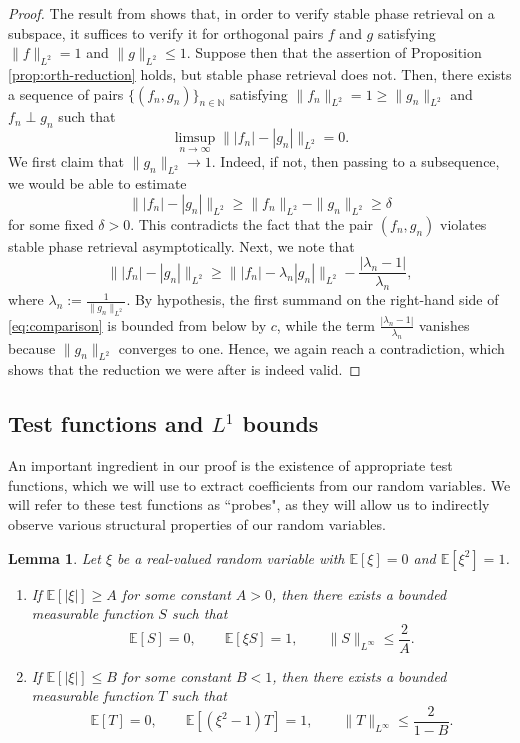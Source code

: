 \documentclass[11pt]{amsart}
\numberwithin{equation}{section}
\newtheorem{lemma}[theorem]{Lemma}
\theoremstyle{definition}
\theoremstyle{remark}
\newcommand{\E}{\mathbb E}
\newcommand{\N}{\mathbb N}
\newcommand{\abs}[1]{\lvert #1 \rvert}
\newcommand{\norm}[1]{\lVert #1 \rVert}
\begin{document}
\begin{proof} The result from \cite[Theorem~3.9]{FOTP} shows that, in order to verify stable phase retrieval on a subspace, it suffices to verify it for orthogonal pairs $f$ and $g$ satisfying $\|f\|_{L^2}=1$ and $\|g\|_{L^2}\le 1$. Suppose then that the assertion of Proposition \ref{prop:orth-reduction} holds, but stable phase retrieval does not. Then, there exists a sequence of pairs $\{(f_n,g_n)\}_{n \in \N}$ satisfying $\|f_n\|_{L^2} = 1 \geq \|g_n\|_{L^2}$ and $f_n \perp g_n$ such that
\[
\limsup_{n \to \infty} \| |f_n| - |g_n| \|_{L^2} = 0.
\]
We first claim that $\|g_n\|_{L^2} \to 1.$ Indeed, if not, then passing to a subsequence, we would be able to estimate 
\[
\||f_n| - |g_n|\|_{L^2} \geq \|f_n\|_{L^2} - \|g_n\|_{L^2} \ge \delta
\]
for some fixed $\delta>0$. This contradicts the fact that the pair $(f_n,g_n)$ violates stable phase retrieval asymptotically. Next,  we note that
\begin{equation}\label{eq:comparison}
\||f_n| - |g_n|\|_{L^2} \geq \| |f_n| - \lambda_n |g_n|\|_{L^2} - \frac{|\lambda_n - 1|}{\lambda_n},
\end{equation}
where $\lambda_n := \frac{1}{\|g_n\|_{L^2}}.$ By hypothesis, the first summand on the right-hand side of \eqref{eq:comparison} is bounded from below by $c$, while the term $\frac{|\lambda_n - 1|}{\lambda_n}$ vanishes because $\|g_n\|_{L^2}$ converges to one. Hence, we again reach a contradiction, which shows that the reduction we were after is indeed valid. 
\end{proof}



\subsection{Test functions and \texorpdfstring{$L^1$}{L1} bounds}
An important ingredient in our proof is the existence of appropriate test functions, which we will use to extract coefficients from our random variables. We will refer to these test functions as ``probes", as they will allow us to indirectly observe various structural properties of our random variables.
\begin{lemma}\label{lem:probes}
Let $\xi$ be a real-valued random variable with $\E[\xi]=0$ and $\E[\xi^2]=1$.

\begin{enumerate}[label=\rm(\arabic*)]
\item If $\E[\abs{\xi}]\ge A$ for some constant $A>0$, then there exists a bounded measurable
function $S$ such that
\[
\E[S]=0,
\qquad
\E[\xi S]=1,
\qquad
\norm{S}_{L^\infty}\le \frac{2}{A}.
\]
\item If $\E[\abs{\xi}]\le B$ for some constant $B<1$, then there exists a bounded measurable
function $T$ such that
\[
\E[T]=0,
\qquad
\E[(\xi^2-1)T]=1,
\qquad
\norm{T}_{L^\infty}\le \frac{2}{1-B}.
\]
\end{enumerate}
\end{lemma}
\end{document}
